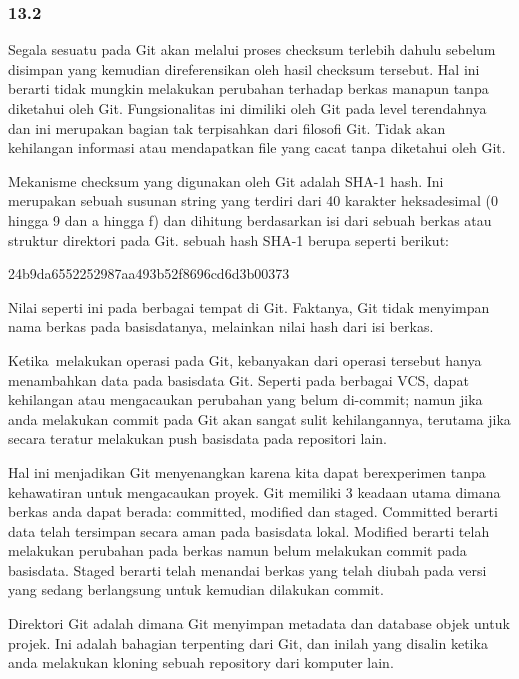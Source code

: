 \subsubsection*{13.2 }
 \par
Segala sesuatu pada Git akan melalui proses checksum terlebih dahulu sebelum disimpan yang kemudian direferensikan oleh hasil checksum tersebut. Hal ini berarti tidak mungkin melakukan perubahan terhadap berkas manapun tanpa diketahui oleh Git. Fungsionalitas ini dimiliki oleh Git pada level terendahnya dan ini merupakan bagian tak terpisahkan dari filosofi Git. Tidak akan kehilangan informasi atau mendapatkan file yang cacat tanpa diketahui oleh Git. \par
Mekanisme checksum yang digunakan oleh Git adalah SHA-1 hash. Ini merupakan sebuah susunan string yang terdiri dari 40 karakter heksadesimal (0 hingga 9 dan a hingga f) dan dihitung berdasarkan isi dari sebuah berkas atau struktur direktori pada Git. sebuah hash SHA-1 berupa seperti berikut: \par
\noindent 
24b9da6552252987aa493b52f8696cd6d3b00373 \par
\vspace{12pt}
Nilai seperti ini pada berbagai tempat di Git. Faktanya, Git tidak menyimpan nama berkas pada basisdatanya, melainkan nilai hash dari isi berkas. \par
Ketika~melakukan operasi pada Git, kebanyakan dari operasi tersebut hanya menambahkan data pada basisdata Git. Seperti pada berbagai VCS, dapat kehilangan atau mengacaukan perubahan yang belum di-commit; namun jika anda melakukan commit pada Git akan sangat sulit kehilangannya, terutama jika  secara teratur melakukan push basisdata pada repositori lain. \par
Hal ini menjadikan Git menyenangkan karena kita dapat berexperimen tanpa kehawatiran untuk mengacaukan proyek. Git memiliki 3 keadaan utama dimana berkas anda dapat berada: committed, modified dan staged. Committed berarti data telah tersimpan secara aman pada basisdata lokal. Modified berarti telah melakukan perubahan pada berkas namun belum melakukan commit pada basisdata. Staged berarti telah menandai berkas yang telah diubah pada versi yang sedang berlangsung untuk kemudian dilakukan commit. \par
Direktori Git adalah dimana Git menyimpan metadata dan database objek untuk projek. Ini adalah bahagian terpenting dari Git, dan inilah yang disalin ketika anda melakukan kloning sebuah repository dari komputer lain. \par
